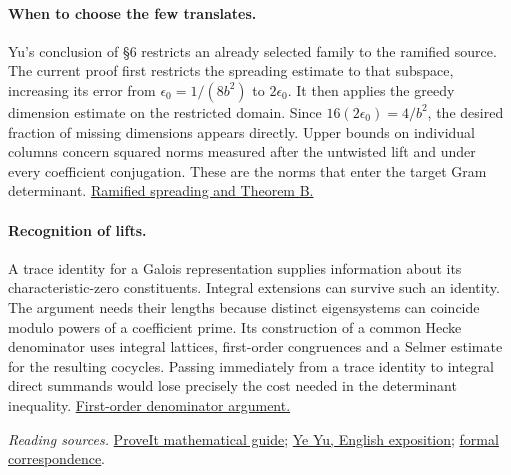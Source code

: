 \paragraph{When to choose the few translates.}
Yu's conclusion of \S6 restricts an already selected family to the ramified source. The current proof first restricts the spreading estimate to that subspace, increasing its error from $\epsilon_0=1/(8b^2)$ to $2\epsilon_0$. It then applies the greedy dimension estimate on the restricted domain. Since $16(2\epsilon_0)=4/b^2$, the desired fraction of missing dimensions appears directly. Upper bounds on individual columns concern squared norms measured after the untwisted lift and under every coefficient conjugation. These are the norms that enter the target Gram determinant. \href{https://github.com/VladimirReshetnikov/ProveIt/blob/7a5bb1e051e4bad127bafe90abbea19764778e32/Analysis/GeneralizedRiemannHypothesis/Lean/grh/src/New/Reduction/ShortAndEnough.lean\#L400-L458}{Ramified spreading and Theorem B.}

\paragraph{Recognition of lifts.}
A trace identity for a Galois representation supplies information about its characteristic-zero constituents. Integral extensions can survive such an identity. The argument needs their lengths because distinct eigensystems can coincide modulo powers of a coefficient prime. Its construction of a common Hecke denominator uses integral lattices, first-order congruences and a Selmer estimate for the resulting cocycles. Passing immediately from a trace identity to integral direct summands would lose precisely the cost needed in the determinant inequality. \href{https://github.com/VladimirReshetnikov/ProveIt/blob/7a5bb1e051e4bad127bafe90abbea19764778e32/Analysis/GeneralizedRiemannHypothesis/Lean/grh/src/New/Congruences/FirstOrder/DenominatorBound.lean}{First-order denominator argument.}

\medskip
\noindent\emph{Reading sources.}
\href{https://github.com/VladimirReshetnikov/ProveIt/tree/7a5bb1e051e4bad127bafe90abbea19764778e32/Analysis/GeneralizedRiemannHypothesis/docs/guide}{ProveIt mathematical guide};
\href{https://github.com/sdyy1990/riemann-hypothesis/blob/5edf43ce39c068fec64e0cc122e9cbdcec343b24/GRH_Proof_EN.md}{Ye Yu, English exposition};
\href{https://github.com/sdyy1990/riemann-hypothesis/blob/5edf43ce39c068fec64e0cc122e9cbdcec343b24/GRH_Lean4_Correspondence.md}{formal correspondence}.
